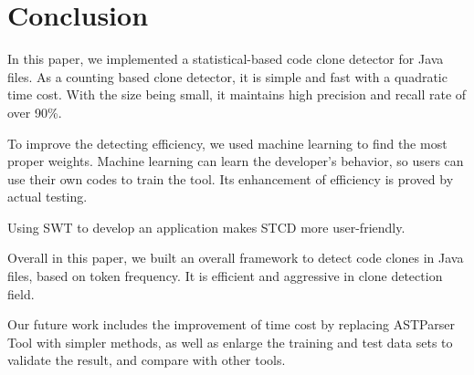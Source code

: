 \documentclass[../main.tex]{subfiles}
\begin{document}
\section{Conclusion}

In this paper, we implemented a statistical-based code clone detector for Java files. As a counting based clone detector, it is simple and fast with a quadratic time cost. With the size being small, it maintains high precision and recall rate of over 90\%.

To improve the detecting efficiency, we used machine learning to find the most proper weights. Machine learning can learn the developer's behavior, so users can use their own codes to train the tool. Its enhancement of efficiency is proved by actual testing.

Using SWT to develop an application makes STCD more user-friendly.

Overall in this paper, we built an overall framework to detect code clones in Java files, based on token frequency. It is efficient and aggressive in clone detection field.


Our future work includes the improvement of time cost by replacing ASTParser Tool with simpler methods, as well as enlarge the training and test data sets to validate the result, and compare with other tools.
\end{document}
